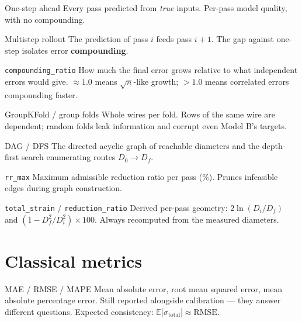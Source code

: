 \documentclass[11pt,a4paper]{article}
\newcommand{\code}[1]{\texttt{\small #1}}
\newenvironment{terms}
  {\begin{description}[style=unboxed,leftmargin=1.2em,itemsep=0.45em,parsep=0pt,
                       font=\normalfont\bfseries]}
  {\end{description}}
\begin{document}
\begin{terms}
  \item[One-step ahead] Every pass predicted from \emph{true} inputs. Per-pass
    model quality, with no compounding.

  \item[Multistep rollout] The prediction of pass $i$ feeds pass $i+1$. The gap
    against one-step isolates error \textbf{compounding}.

  \item[\code{compounding\_ratio}] How much the final error grows relative to
    what independent errors would give. $\approx 1.0$ means $\sqrt{n}$-like
    growth; $> 1.0$ means correlated errors compounding faster.

  \item[GroupKFold / group folds] Whole wires per fold. Rows of the same wire
    are dependent; random folds leak information and corrupt even Model B's
    targets.

  \item[DAG / DFS] The directed acyclic graph of reachable diameters and the
    depth-first search enumerating routes $D_0 \rightarrow D_f$.

  \item[\code{rr\_max}] Maximum admissible reduction ratio per pass (\%).
    Prunes infeasible edges during graph construction.

  \item[\code{total\_strain} / \code{reduction\_ratio}] Derived per-pass
    geometry: $2\ln(D_i/D_f)$ and $(1 - D_f^2/D_i^2)\times 100$. Always
    recomputed from the measured diameters.
\end{terms}

\section{Classical metrics}

\begin{terms}
  \item[MAE / RMSE / MAPE] Mean absolute error, root mean squared error, mean
    absolute percentage error. Still reported alongside calibration --- they
    answer different questions. Expected consistency:
    $\mathbb{E}\big[\sigma_{\text{total}}\big] \approx \text{RMSE}$.
\end{terms}
\end{document}
